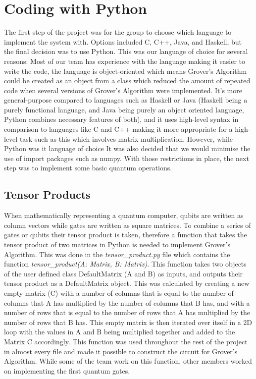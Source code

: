 \documentclass{article}
\begin{document}
\pagebreak

\section{Coding with Python}
The first step of the project was for the group to choose which language to implement the system with. Options included C, C++, Java, and Haskell, but the final decision was to use Python. This was our language of choice for several reasons: Most of our team has experience with the language making it easier to write the code, the language is object-oriented which means Grover’s Algorithm could be created as an object from a class which reduced the amount of repeated code when several versions of Grover's Algorithm were  implemented. It’s more general-purpose compared to languages such as Haskell or Java (Haskell being a purely functional language, and Java being purely an object oriented language, Python combines necessary features of both), and it uses high-level syntax in comparison to languages like C and C++ making it more appropriate for a high-level task such as this which involves matrix multiplication. However, while Python was it language of choice It was also decided that we would minimise the use of import packages such as numpy. With those restrictions in place, the next step was to implement some basic quantum operations.

\subsection{Tensor Products}

When mathematically representing a quantum computer, qubits are written as column vectors while gates are written as square matrices. To combine a series of gates or qubits their tensor product is taken, therefore a function that takes the tensor product of two matrices in Python is needed to implement Grover's Algorithm. This was done in the \textit{tensor\_product.py} file which contains the function \textit{tensor\_product(A: Matrix, B: Matrix)}. This function takes two objects of the user defined class DefaultMatrix (A and B) as inputs, and outputs their tensor product as a DefaultMatrix object. This was calculated by creating a new empty matrix (C) with a number of columns that is equal to the number of columns that A has multiplied by the number of columns that B has, and with a number of rows that is equal to the number of rows that A has multiplied by the number of rows that B has. This empty matrix is then iterated over itself in a 2D loop with the values in A and B being multiplied together and added to the Matrix C accordingly. This function was used throughout the rest of the project in almost every file and made it possible to construct the circuit for Grover's Algorithm. While some of the team work on this function, other members worked on implementing the first quantum gates.
\end{document}
